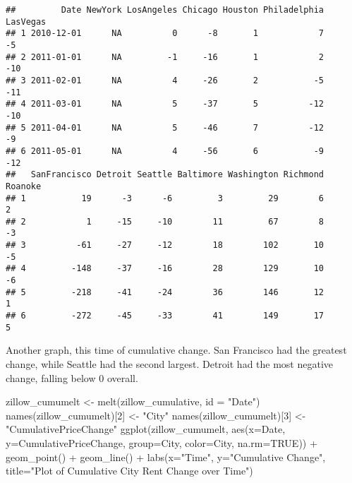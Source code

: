 \documentclass[
]{article}
\newenvironment{Shaded}{\begin{snugshade}}{\end{snugshade}}
\newcommand{\AttributeTok}[1]{\textcolor[rgb]{0.77,0.63,0.00}{#1}}
\newcommand{\ConstantTok}[1]{\textcolor[rgb]{0.00,0.00,0.00}{#1}}
\newcommand{\DecValTok}[1]{\textcolor[rgb]{0.00,0.00,0.81}{#1}}
\newcommand{\FunctionTok}[1]{\textcolor[rgb]{0.00,0.00,0.00}{#1}}
\newcommand{\NormalTok}[1]{#1}
\newcommand{\OtherTok}[1]{\textcolor[rgb]{0.56,0.35,0.01}{#1}}
\newcommand{\SpecialCharTok}[1]{\textcolor[rgb]{0.00,0.00,0.00}{#1}}
\newcommand{\StringTok}[1]{\textcolor[rgb]{0.31,0.60,0.02}{#1}}
\begin{document}
\begin{verbatim}
##         Date NewYork LosAngeles Chicago Houston Philadelphia LasVegas
## 1 2010-12-01      NA          0      -8       1            7       -5
## 2 2011-01-01      NA         -1     -16       1            2      -10
## 3 2011-02-01      NA          4     -26       2           -5      -11
## 4 2011-03-01      NA          5     -37       5          -12      -10
## 5 2011-04-01      NA          5     -46       7          -12       -9
## 6 2011-05-01      NA          4     -56       6           -9      -12
##   SanFrancisco Detroit Seattle Baltimore Washington Richmond Roanoke
## 1           19      -3      -6         3         29        6       2
## 2            1     -15     -10        11         67        8      -3
## 3          -61     -27     -12        18        102       10      -5
## 4         -148     -37     -16        28        129       10      -6
## 5         -218     -41     -24        36        146       12       1
## 6         -272     -45     -33        41        149       17       5
\end{verbatim}

Another graph, this time of cumulative change. San Francisco had the
greatest change, while Seattle had the second largest. Detroit had the
most negative change, falling below 0 overall.

\begin{Shaded}
\begin{Highlighting}[]
\NormalTok{zillow\_cumumelt }\OtherTok{\textless{}{-}} \FunctionTok{melt}\NormalTok{(zillow\_cumulative, }\AttributeTok{id =} \StringTok{"Date"}\NormalTok{)}
\FunctionTok{names}\NormalTok{(zillow\_cumumelt)[}\DecValTok{2}\NormalTok{] }\OtherTok{\textless{}{-}} \StringTok{"City"}
\FunctionTok{names}\NormalTok{(zillow\_cumumelt)[}\DecValTok{3}\NormalTok{] }\OtherTok{\textless{}{-}} \StringTok{"CumulativePriceChange"}
\FunctionTok{ggplot}\NormalTok{(zillow\_cumumelt, }\FunctionTok{aes}\NormalTok{(}\AttributeTok{x=}\NormalTok{Date, }\AttributeTok{y=}\NormalTok{CumulativePriceChange, }\AttributeTok{group=}\NormalTok{City, }\AttributeTok{color=}\NormalTok{City, }\AttributeTok{na.rm=}\ConstantTok{TRUE}\NormalTok{)) }\SpecialCharTok{+} \FunctionTok{geom\_point}\NormalTok{() }\SpecialCharTok{+} \FunctionTok{geom\_line}\NormalTok{() }\SpecialCharTok{+} \FunctionTok{labs}\NormalTok{(}\AttributeTok{x=}\StringTok{"Time"}\NormalTok{, }\AttributeTok{y=}\StringTok{"Cumulative Change"}\NormalTok{, }\AttributeTok{title=}\StringTok{"Plot of Cumulative City Rent Change over Time"}\NormalTok{)}
\end{Highlighting}
\end{Shaded}
\end{document}
